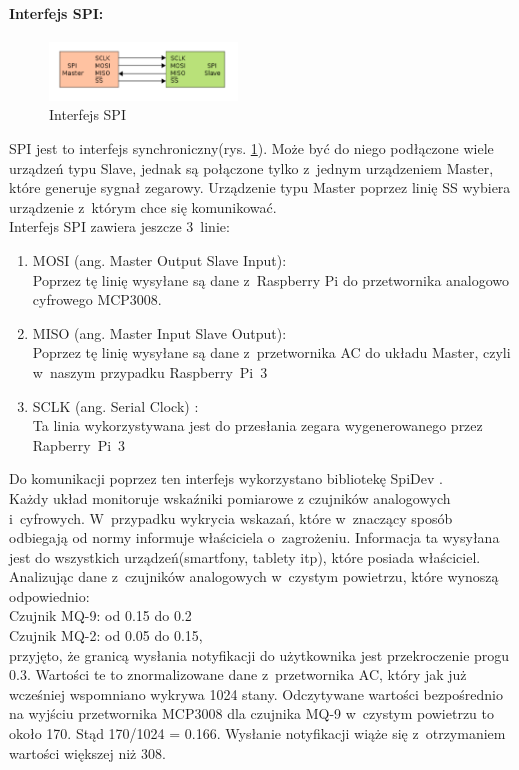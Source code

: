 \paragraph{Interfejs SPI:}
\begin{figure}[ht]
	\centering
	\includegraphics[width=5cm]{SPI.png}
	\caption{Interfejs SPI \protect\cite{spi}}
	\label{spi}
\end{figure}
SPI jest to interfejs synchroniczny(rys. \ref{spi}). Może być do niego podłączone wiele urządzeń typu Slave, jednak są połączone tylko z~jednym urządzeniem Master, które generuje sygnał zegarowy. Urządzenie typu Master poprzez linię SS wybiera urządzenie z~którym chce się komunikować. \\
Interfejs SPI zawiera jeszcze 3~linie:
\begin{enumerate} 
\item MOSI (ang. Master Output Slave Input): \\
Poprzez tę linię wysyłane są dane z~Raspberry Pi do przetwornika analogowo cyfrowego MCP3008.
\item MISO (ang. Master Input Slave Output):\\
Poprzez tę linię wysyłane są dane z~przetwornika AC do układu Master, czyli w~naszym przypadku Raspberry~Pi~3
\item SCLK (ang. Serial Clock) :\\
Ta linia wykorzystywana jest do przesłania zegara wygenerowanego przez Rapberry~Pi~3
\end{enumerate}
Do komunikacji poprzez ten interfejs wykorzystano bibliotekę SpiDev \cite{spidev}. \\
Każdy układ monitoruje wskaźniki pomiarowe z czujników analogowych i~cyfrowych. W~przypadku wykrycia wskazań, które w~znaczący sposób odbiegają od normy informuje właściciela o~zagrożeniu. Informacja ta wysyłana jest do wszystkich urządzeń(smartfony, tablety itp), które posiada właściciel.  Analizując dane z~czujników analogowych w~czystym powietrzu, które wynoszą odpowiednio:\\
Czujnik MQ-9: od 0.15 do 0.2\\
Czujnik MQ-2: od 0.05 do 0.15,\\
przyjęto, że granicą wysłania notyfikacji do użytkownika jest przekroczenie progu 0.3. Wartości te to znormalizowane dane z~przetwornika AC, który jak już wcześniej wspomniano wykrywa 1024 stany. Odczytywane wartości bezpośrednio na wyjściu przetwornika MCP3008 dla czujnika MQ-9 w~czystym powietrzu to około 170. Stąd 170/1024 = 0.166. Wysłanie notyfikacji wiąże się z~otrzymaniem wartości większej niż 308.


